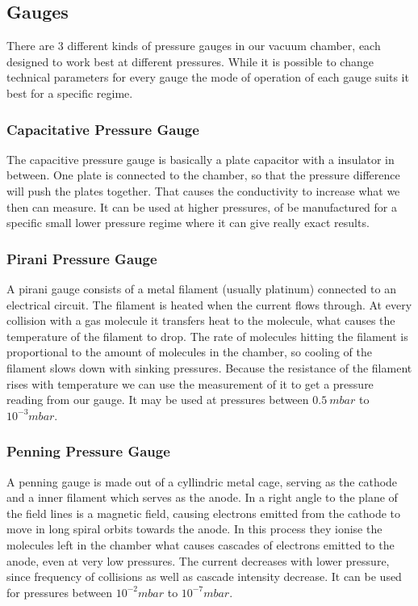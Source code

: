 \documentclass[]{article}
\begin{document}
\subsection{Gauges}
There are 3 different kinds of pressure gauges in our vacuum chamber, each designed to work best at different pressures. While it is possible to change technical parameters for every gauge the mode of operation of each gauge suits it best for a specific regime.

\subsubsection[Capacitive]{Capacitative Pressure Gauge}
The capacitive pressure gauge is basically a plate capacitor with a insulator in between. One plate is connected to the chamber, so that the pressure difference will push the plates together. That causes the conductivity to increase what we then can measure. It can be used at higher pressures, of be manufactured for a specific small lower pressure regime where it can give really exact results. 

\subsubsection[Pirani]{Pirani Pressure Gauge}
A pirani gauge consists of a metal filament (usually platinum) connected to an electrical circuit. The filament is heated when the current flows through. At every collision with a gas molecule it transfers heat to the molecule, what causes the temperature of the filament to drop. The rate of molecules hitting the filament is proportional to the amount of molecules in the chamber, so cooling of the filament slows down with sinking pressures. Because the resistance of the filament rises with temperature we can use the measurement of it to get a pressure reading from our gauge. It may be used at pressures between $0.5\ mbar$ to $10^{-3}mbar$.

\subsubsection[Penning]{Penning Pressure Gauge}
A penning gauge is made out of a cyllindric metal cage, serving as the cathode and a inner filament which serves as the anode. In a right angle to the plane of the field lines is a magnetic field, causing electrons emitted from the cathode to move in long spiral orbits towards the anode. In this process they ionise the molecules left in the chamber what causes cascades of electrons emitted to the anode, even at very low pressures. The current decreases with lower pressure, since frequency of collisions as well as cascade intensity decrease. It can be used for pressures between $10^{-2}mbar$ to $10^{-7}mbar$.
\end{document}
